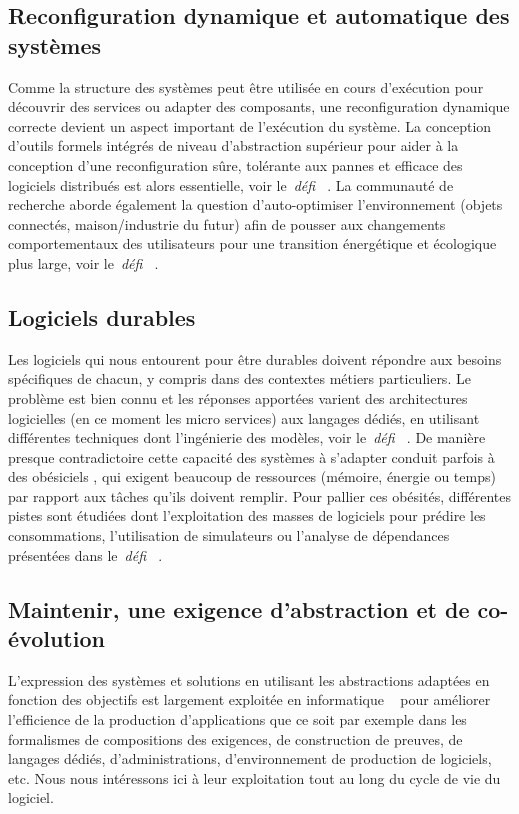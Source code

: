 \documentclass[11pt]{article}
\newcommand{\defi}[1]{\emph{défi~%
\cite{#1}}}
\begin{document}
\subsection{Reconfiguration dynamique et automatique des systèmes \label{ss:maintenance:reconfiguration}}
Comme la structure des systèmes peut être utilisée en cours d'exécution pour découvrir des services ou adapter des composants, une reconfiguration dynamique correcte devient un aspect important de l'exécution du système. La conception d'outils formels intégrés de niveau d'abstraction supérieur pour aider à la conception d'une reconfiguration sûre, tolérante aux pannes et efficace des logiciels distribués est alors essentielle, voir le~\defi{reconfiguration}. 
La communauté de recherche aborde  également la question d’auto-optimiser 
l'environnement (objets connectés, maison/industrie du futur)
afin de  pousser aux changements comportementaux des utilisateurs 
pour une transition énergétique et écologique plus large, voir le~\defi{vert}.


\subsection{Logiciels durables\label{ss:maintenance:vert}}
Les logiciels qui nous entourent pour être durables doivent répondre aux besoins spécifiques de chacun, y compris dans des contextes métiers particuliers. Le problème est bien connu et les réponses apportées varient des architectures logicielles (en ce moment les micro services) aux langages dédiés, en utilisant différentes techniques dont l'ingénierie des modèles, voir le~\defi{coevolution}. 
De manière presque contradictoire 
cette capacité des systèmes à s’adapter conduit parfois à des
\og obésiciels \fg, qui exigent beaucoup de ressources (mémoire, énergie ou temps) par rapport aux tâches qu'ils doivent remplir. Pour pallier ces obésités, 
différentes pistes sont étudiées dont l'exploitation des masses de logiciels pour prédire les consommations, l'utilisation de simulateurs ou l'analyse de dépendances présentées dans le~\defi{vert}.

\subsection{Maintenir, une exigence d'abstraction et de co-évolution\label{ss:maintenance:abstractions}}
L'expression des systèmes et solutions en utilisant les abstractions adaptées en fonction des objectifs est largement exploitée en informatique ~\cite{DBLP:journals/sigcse/Gurer02} pour améliorer l'efficience de la production d'applications que ce soit par exemple dans les formalismes de compositions des exigences, de construction de preuves, de langages dédiés, d'administrations, d'environnement de production de logiciels, etc. Nous nous intéressons ici à leur exploitation tout au long du cycle de vie du logiciel.
\end{document}
